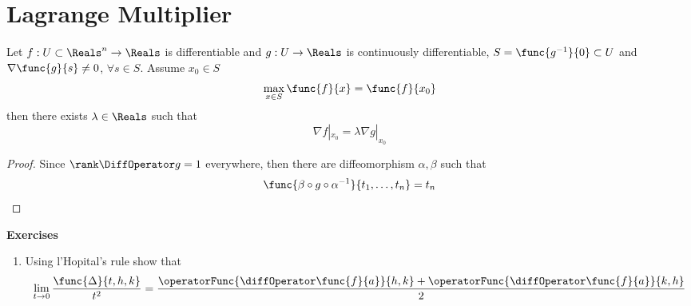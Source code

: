 \section{Lagrange Multiplier}
\begin{theorem}
    Let \(f: U \subset \Reals^n \to \Reals\) is differentiable and \(g : U \to \Reals\) is continuously differentiable, \(S = \func{g^{-1}}{0} \subset U\) and \(\nabla \func{g}{s} \neq 0\), \(\forall s \in S\). Assume \(x_0 \in S\) 
    \begin{equation*}
        \max_{x \in S} \func{f}{x} = \func{f}{x_0}
    \end{equation*}
    then there exists \(\lambda \in \Reals\) such that 
    \begin{equation*}
        \nabla f|_{x_0} = \lambda \nabla g|_{x_0}
    \end{equation*}
\end{theorem}

\begin{proof}
    Since \(\rank \DiffOperator g = 1\) everywhere, then there are diffeomorphism \(\alpha,\beta\) such that 
    \begin{equation*}
        \func{\beta \circ g \circ \alpha^{-1}}{t_1, \dots ,t_n} = t_n
    \end{equation*}
\end{proof}

{\Large\textbf{Exercises}}
\begin{enumerate}
    \item Using l'Hopital's rule show that
          \begin{equation*}
              \lim_{t \to 0} \dfrac{\func{\Delta}{t,h,k}}{t^2} = \dfrac{\operatorFunc{\diffOperator \func{f}{a}}{h,k} + \operatorFunc{\diffOperator \func{f}{a}}{k,h}}{2}
          \end{equation*}
\end{enumerate}
\newpage
